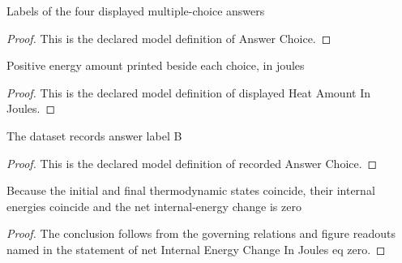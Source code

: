 \begin{definition}
  \label{def:physics:phyx-mini-0470:phyxminiproblems-problemphyxmini0470-answerchoice}
  Labels of the four displayed multiple-choice answers
\end{definition}
\begin{proof}
  This is the declared model definition of Answer Choice.
\end{proof}
\begin{definition}
  \label{def:physics:phyx-mini-0470:phyxminiproblems-problemphyxmini0470-displayedheatamountinjoules}
  Positive energy amount printed beside each choice, in joules
\end{definition}
\begin{proof}
  This is the declared model definition of displayed Heat Amount In Joules.
\end{proof}
\begin{definition}
  \label{def:physics:phyx-mini-0470:phyxminiproblems-problemphyxmini0470-recordedanswerchoice}
  The dataset records answer label B
\end{definition}
\begin{proof}
  This is the declared model definition of recorded Answer Choice.
\end{proof}
\begin{lemma}
  \label{lem:physics:phyx-mini-0470:phyxminiproblems-problemphyxmini0470-netinternalenergychangeinjoules-eq-zero}
  Because the initial and final thermodynamic states coincide, their internal energies coincide and the net internal-energy change is zero
\end{lemma}
\begin{proof}
  The conclusion follows from the governing relations and figure readouts named in the statement of net Internal Energy Change In Joules eq zero.
\end{proof}
